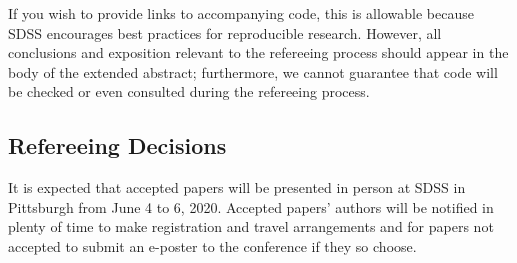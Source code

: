 \documentclass[10pt]{article}
\begin{document}
If you wish to provide links to accompanying code, this is allowable because
SDSS encourages best practices for reproducible research.  However, all
conclusions and exposition relevant to the refereeing process should appear in
the body of the extended abstract; furthermore, we cannot guarantee that 
code will be checked or even consulted during the refereeing process.

\subsection{Refereeing Decisions}
It is expected that accepted papers will be presented in person at SDSS in Pittsburgh 
from June 4 to 6, 2020.
Accepted papers' authors will be notified in plenty of time to make registration and travel 
arrangements and for papers not accepted to submit an e-poster to the 
conference if they so choose.


\end{document}
